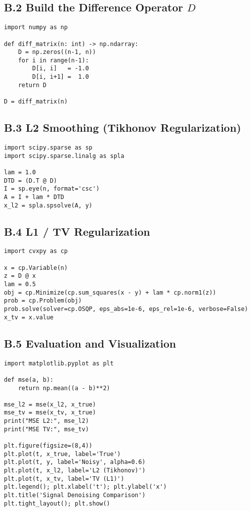 \documentclass[11pt,a4paper]{article}
\begin{document}
\subsection*{B.2 Build the Difference Operator \(D\)}
\begin{lstlisting}[style=mypython,caption={Forward-difference operator}]
import numpy as np

def diff_matrix(n: int) -> np.ndarray:
    D = np.zeros((n-1, n))
    for i in range(n-1):
        D[i, i]   = -1.0
        D[i, i+1] =  1.0
    return D

D = diff_matrix(n)
\end{lstlisting}

\subsection*{B.3 L2 Smoothing (Tikhonov Regularization)}
\begin{lstlisting}[style=mypython,caption={L2 smoothing}]
import scipy.sparse as sp
import scipy.sparse.linalg as spla

lam = 1.0
DTD = (D.T @ D)
I = sp.eye(n, format='csc')
A = I + lam * DTD
x_l2 = spla.spsolve(A, y)
\end{lstlisting}

\subsection*{B.4 L1 / TV Regularization}
\begin{lstlisting}[style=mypython,caption={TV denoising}]
import cvxpy as cp

x = cp.Variable(n)
z = D @ x
lam = 0.5
obj = cp.Minimize(cp.sum_squares(x - y) + lam * cp.norm1(z))
prob = cp.Problem(obj)
prob.solve(solver=cp.OSQP, eps_abs=1e-6, eps_rel=1e-6, verbose=False)
x_tv = x.value
\end{lstlisting}
\pagebreak
\subsection*{B.5 Evaluation and Visualization}
\begin{lstlisting}[style=mypython,caption={Evaluation}]
import matplotlib.pyplot as plt

def mse(a, b):
    return np.mean((a - b)**2)

mse_l2 = mse(x_l2, x_true)
mse_tv = mse(x_tv, x_true)
print("MSE L2:", mse_l2)
print("MSE TV:", mse_tv)

plt.figure(figsize=(8,4))
plt.plot(t, x_true, label='True')
plt.plot(t, y, label='Noisy', alpha=0.6)
plt.plot(t, x_l2, label='L2 (Tikhonov)')
plt.plot(t, x_tv, label='TV (L1)')
plt.legend(); plt.xlabel('t'); plt.ylabel('x')
plt.title('Signal Denoising Comparison')
plt.tight_layout(); plt.show()
\end{lstlisting}
\end{document}
